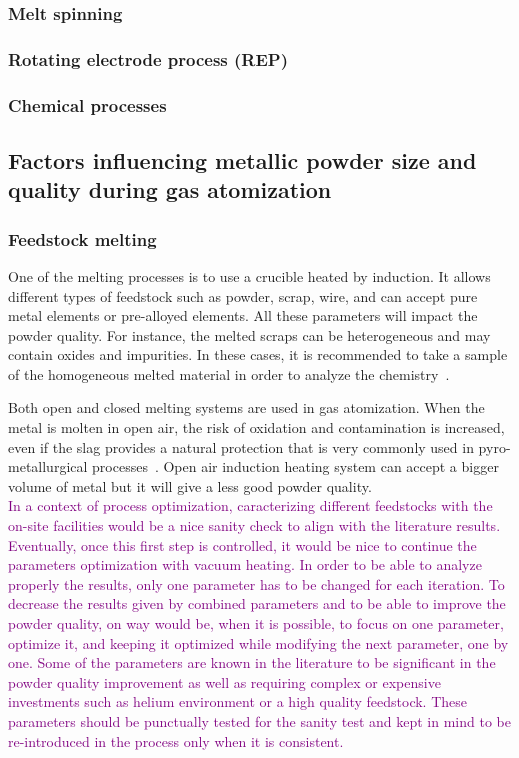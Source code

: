 \subsubsection{Melt spinning}
\subsubsection{Rotating electrode process (REP)}
\subsubsection{Chemical processes}

\subsection{Factors influencing metallic powder size and quality during gas atomization}

\subsubsection{Feedstock melting}

One of the melting processes is to use a crucible heated by induction. It allows different types of feedstock such as powder, scrap, wire, and can accept pure metal elements or pre-alloyed elements. All these parameters will impact the powder quality. For instance, the melted scraps can be heterogeneous and may contain oxides and impurities. In these cases, it is recommended to take a sample of the homogeneous melted material in order to analyze the chemistry~\cite{Kassym2020Atomizationprocesses}.

Both open and closed melting systems are used in gas atomization. When the metal is molten in open air, the risk of oxidation and contamination is increased, even if the slag provides a natural protection that is very commonly used in pyro-metallurgical processes~\cite{Holappa2016SlagFormation}. Open air induction heating system can accept a bigger volume of metal but it will give a less good powder quality.\\

\textcolor{Purple}{In a context of process optimization, caracterizing different feedstocks with the on-site facilities would be a nice sanity check to align with the literature results. Eventually, once this first step is controlled, it would be nice to continue the parameters optimization with vacuum heating. In order to be able to analyze properly the results, only one parameter has to be changed for each iteration. To decrease the results given by combined parameters and to be able to improve the powder quality, on way would be, when it is possible, to focus on one parameter, optimize it, and keeping it optimized while modifying the next parameter, one by one. Some of the parameters are known in the literature to be significant in the powder quality improvement as well as requiring complex or expensive investments such as helium environment or a high quality feedstock. These parameters should be punctually tested for the sanity test and kept in mind to be re-introduced in the process only when it is consistent.}


